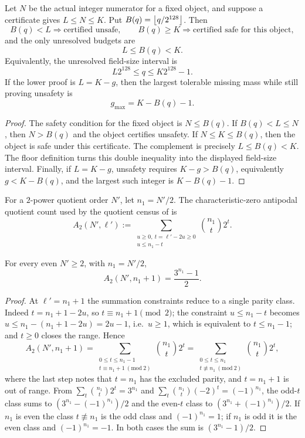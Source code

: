 \begin{theorem}\label{thm:v13-windows}
Let $N$ be the actual integer numerator for a fixed object, and suppose a certificate gives $L\le N\le K$.  Put $B(q)=\left\lfloor q/2^{128}\right\rfloor$.  Then
\[
        B(q)<L \Rightarrow \text{certified unsafe},
        \qquad
        B(q)\ge K \Rightarrow \text{certified safe for this object},
\]
and the only unresolved budgets are
\[
        L\le B(q)<K.
\]
Equivalently, the unresolved field-size interval is
\[
        L2^{128}\le q\le K2^{128}-1.
\]
If the lower proof is $L=K-g$, then the largest tolerable missing mass while still proving unsafety is
\[
        g_{\max}=K-B(q)-1.
\]
\end{theorem}

\begin{proof}
The safety condition for the fixed object is $N\le B(q)$.  If $B(q)<L\le N$, then $N>B(q)$ and the object certifies unsafety.  If $N\le K\le B(q)$, then the object is safe under this certificate.  The complement is precisely $L\le B(q)<K$.  The floor definition turns this double inequality into the displayed field-size interval.  Finally, if $L=K-g$, unsafety requires $K-g>B(q)$, equivalently $g<K-B(q)$, and the largest such integer is $K-B(q)-1$.
\end{proof}

For a $2$-power quotient order $N'$, let $n_1=N'/2$.  The characteristic-zero antipodal quotient count used by the quotient census of \cite{Cho26b} is
\[
        A_2(N',\ell')
        :=
        \sum_{\substack{u\ge0,\ t=\ell'-2u\ge0\\ u\le n_1-t}}
        \binom{n_1}{t}2^t .
\]

\begin{lemma}\label{lem:v13-census-identity}
For every even $N'\ge2$, with $n_1=N'/2$,
\[
        A_2(N',n_1+1)=\frac{3^{n_1}-1}{2}.
\]
\end{lemma}

\begin{proof}
At $\ell'=n_1+1$ the summation constraints reduce to a single parity class.  Indeed $t=n_1+1-2u$, so $t\equiv n_1+1\pmod2$; the constraint $u\le n_1-t$ becomes $u\le n_1-(n_1+1-2u)=2u-1$, i.e.\ $u\ge1$, which is equivalent to $t\le n_1-1$; and $t\ge0$ closes the range.  Hence
\[
        A_2(N',n_1+1)
        =\sum_{\substack{0\le t\le n_1-1\\ t\equiv n_1+1\ (\mathrm{mod}\ 2)}}\binom{n_1}t2^t
        =\sum_{\substack{0\le t\le n_1\\ t\not\equiv n_1\ (\mathrm{mod}\ 2)}}\binom{n_1}t2^t,
\]
where the last step notes that $t=n_1$ has the excluded parity, and $t=n_1+1$ is out of range.  From $\sum_t\binom{n_1}t2^t=3^{n_1}$ and $\sum_t\binom{n_1}t(-2)^t=(-1)^{n_1}$, the odd-$t$ class sums to $(3^{n_1}-(-1)^{n_1})/2$ and the even-$t$ class to $(3^{n_1}+(-1)^{n_1})/2$.  If $n_1$ is even the class $t\not\equiv n_1$ is the odd class and $(-1)^{n_1}=1$; if $n_1$ is odd it is the even class and $(-1)^{n_1}=-1$.  In both cases the sum is $(3^{n_1}-1)/2$.
\end{proof}

